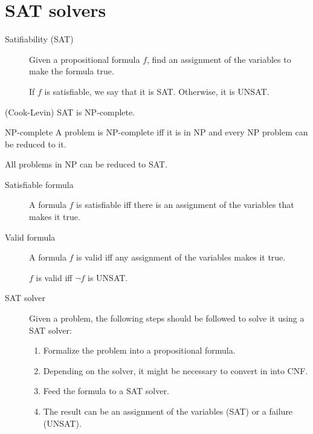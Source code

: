 \chapter{SAT solvers}


\begin{description}
    \item[Satifiability (SAT)] 
        Given a propositional formula $f$, 
        find an assignment of the variables to make the formula true.

        If $f$ is satisfiable, we say that it is SAT. Otherwise, it is UNSAT.
\end{description}

\begin{theorem}(Cook-Levin) 
    SAT is NP-complete.

    \begin{descriptionlist}
        \item[NP-complete]
            A problem is NP-complete iff it is in NP and every NP problem can be reduced to it.
            \begin{remark}
                All problems in NP can be reduced to SAT.
            \end{remark}
    \end{descriptionlist}
\end{theorem}


\begin{description}
    \item[Satisfiable formula] 
        A formula $f$ is satisfiable iff there is an assignment of the variables that makes it true.


    \item[Valid formula] 
        A formula $f$ is valid iff any assignment of the variables makes it true.

        \begin{remark}
            $f$ is valid iff $\lnot f$ is UNSAT.
        \end{remark}


    \item[SAT solver] 
        Given a problem, the following steps should be followed to solve it using a SAT solver:
        \begin{enumerate}
            \item Formalize the problem into a propositional formula.
            \item Depending on the solver, it might be necessary to convert in into CNF.
            \item Feed the formula to a SAT solver.
            \item The result can be an assignment of the variables (SAT) or a failure (UNSAT).
        \end{enumerate}
\end{description}



